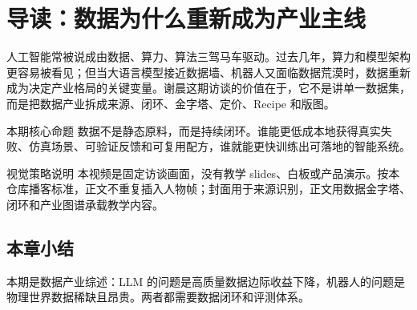 \section{导读：数据为什么重新成为产业主线}

人工智能常被说成由数据、算力、算法三驾马车驱动。过去几年，算力和模型架构更容易被看见；但当大语言模型接近数据墙、机器人又面临数据荒漠时，数据重新成为决定产业格局的关键变量。谢晨这期访谈的价值在于，它不是讲单一数据集，而是把数据产业拆成来源、闭环、金字塔、定价、Recipe 和版图。

\begin{importantbox}{本期核心命题}
数据不是静态原料，而是持续闭环。谁能更低成本地获得真实失败、仿真场景、可验证反馈和可复用配方，谁就能更快训练出可落地的智能系统。
\end{importantbox}

\begin{knowledgebox}{视觉策略说明}
本视频是固定访谈画面，没有教学 slides、白板或产品演示。按本仓库播客标准，正文不重复插入人物帧；封面用于来源识别，正文用数据金字塔、闭环和产业图谱承载教学内容。
\end{knowledgebox}

\subsection{本章小结}

本期是数据产业综述：LLM 的问题是高质量数据边际收益下降，机器人的问题是物理世界数据稀缺且昂贵。两者都需要数据闭环和评测体系。

